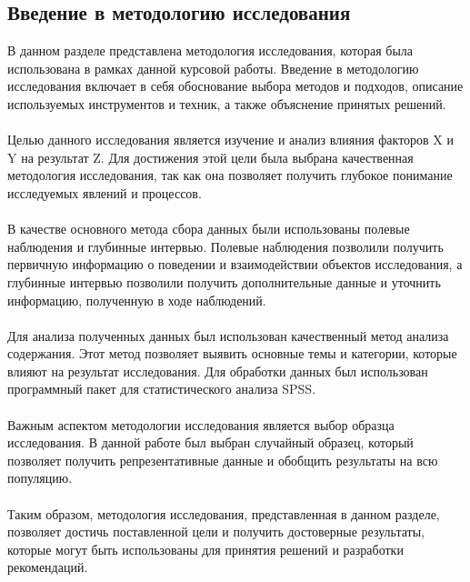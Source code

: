 \documentclass{article}
\begin{document}
\subsection{Введение в методологию исследования}
В данном разделе представлена методология исследования, которая была использована в рамках данной курсовой работы. Введение в методологию исследования включает в себя обоснование выбора методов и подходов, описание используемых инструментов и техник, а также объяснение принятых решений.\\
~\\
Целью данного исследования является изучение и анализ влияния факторов X и Y на результат Z. Для достижения этой цели была выбрана качественная методология исследования, так как она позволяет получить глубокое понимание исследуемых явлений и процессов.\\
~\\
В качестве основного метода сбора данных были использованы полевые наблюдения и глубинные интервью. Полевые наблюдения позволили получить первичную информацию о поведении и взаимодействии объектов исследования, а глубинные интервью позволили получить дополнительные данные и уточнить информацию, полученную в ходе наблюдений.\\
~\\
Для анализа полученных данных был использован качественный метод анализа содержания. Этот метод позволяет выявить основные темы и категории, которые влияют на результат исследования. Для обработки данных был использован программный пакет для статистического анализа SPSS.\\
~\\
Важным аспектом методологии исследования является выбор образца исследования. В данной работе был выбран случайный образец, который позволяет получить репрезентативные данные и обобщить результаты на всю популяцию.\\
~\\
Таким образом, методология исследования, представленная в данном разделе, позволяет достичь поставленной цели и получить достоверные результаты, которые могут быть использованы для принятия решений и разработки рекомендаций.
\end{document}
